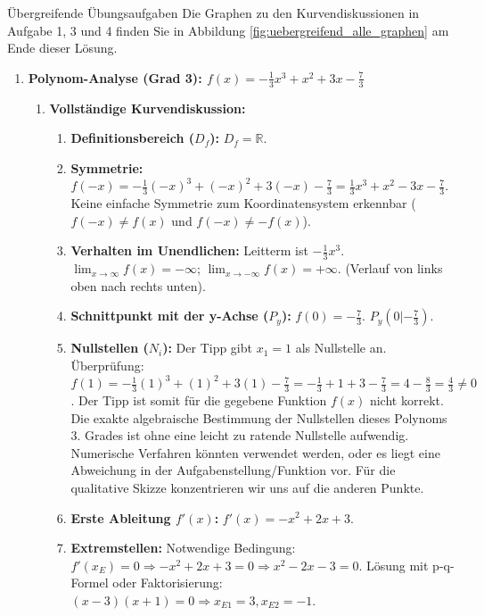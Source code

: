 \begin{loesungsumgebung}{Übergreifende Übungsaufgaben}
Die Graphen zu den Kurvendiskussionen in Aufgabe 1, 3 und 4 finden Sie in Abbildung \ref{fig:uebergreifend_alle_graphen} am Ende dieser Lösung.

\begin{enumerate}
    \item \textbf{Polynom-Analyse (Grad 3): $f(x) = -\frac{1}{3}x^3 + x^2 + 3x - \frac{7}{3}$}
    \begin{enumerate}[label=(\alph*)]
        \item \textbf{Vollständige Kurvendiskussion:}
        \begin{enumerate}[label=\arabic*.]
            \item \textbf{Definitionsbereich ($D_f$):} $D_f = \mathbb{R}$.
            \item \textbf{Symmetrie:}
            $f(-x) = -\frac{1}{3}(-x)^3 + (-x)^2 + 3(-x) - \frac{7}{3} = \frac{1}{3}x^3 + x^2 - 3x - \frac{7}{3}$.
            Keine einfache Symmetrie zum Koordinatensystem erkennbar ($f(-x) \neq f(x)$ und $f(-x) \neq -f(x)$).
            \item \textbf{Verhalten im Unendlichen:} Leitterm ist $-\frac{1}{3}x^3$.
            $\lim_{x \to \infty} f(x) = -\infty$; $\lim_{x \to -\infty} f(x) = +\infty$. (Verlauf von links oben nach rechts unten).
            \item \textbf{Schnittpunkt mit der y-Achse ($P_y$):} $f(0) = -\frac{7}{3}$. $P_y(0|-\frac{7}{3})$.
            \item \textbf{Nullstellen ($N_i$):}
            Der Tipp gibt $x_1=1$ als Nullstelle an. Überprüfung: $f(1) = -\frac{1}{3}(1)^3 + (1)^2 + 3(1) - \frac{7}{3} = -\frac{1}{3} + 1 + 3 - \frac{7}{3} = 4 - \frac{8}{3} = \frac{4}{3} \neq 0$.
            Der Tipp ist somit für die gegebene Funktion $f(x)$ nicht korrekt. Die exakte algebraische Bestimmung der Nullstellen dieses Polynoms 3. Grades ist ohne eine leicht zu ratende Nullstelle aufwendig. Numerische Verfahren könnten verwendet werden, oder es liegt eine Abweichung in der Aufgabenstellung/Funktion vor. Für die qualitative Skizze konzentrieren wir uns auf die anderen Punkte.
            \item \textbf{Erste Ableitung $f'(x)$:} $f'(x) = -x^2 + 2x + 3$.
            \item \textbf{Extremstellen:} Notwendige Bedingung: $f'(x_E)=0 \Rightarrow -x^2 + 2x + 3 = 0 \Rightarrow x^2 - 2x - 3 = 0$.
            Lösung mit p-q-Formel oder Faktorisierung: $(x-3)(x+1)=0 \Rightarrow x_{E1}=3, x_{E2}=-1$.

\end{enumerate}
\end{enumerate}
\end{enumerate}
\end{loesungsumgebung}
